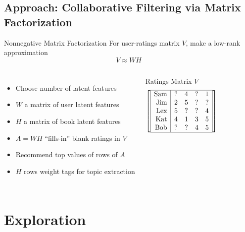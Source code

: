 \documentclass[handout]{beamer}
\begin{document}
\subsection{Approach: Collaborative Filtering via Matrix Factorization}\label{approach}

\begin{frame}
\begin{block}{Nonnegative Matrix Factorization}
\setlength\abovedisplayskip{0pt}
For user-ratings matrix $V$, make a low-rank approximation
\[ V \approx WH\]
\end{block}
\vfill

\begin{columns}
\begin{itemize}[<+->]
\item Choose number of latent features
\item $W$ a matrix of user latent features
\item $H$ a matrix of book latent features
\item %
$A =WH$ ``fills-in'' blank ratings in $V$
\item Recommend top values of rows of $A$
\item $H$ rows weight tags for topic extraction
\end{itemize}
\begin{block}{Ratings Matrix $V$}
\centering
\[\left[\begin{array}{|r|cccc|}\hline
\text{Sam} & ? & 4 & ? & 1 \\
\text{Jim} & 2 & 5 & ? & ? \\
\text{Lex} & 5 & ? & ? & 4 \\
\text{Kat} & 4 & 1 & 3 & 5 \\
\text{Bob} & ? & ? & 4 & 5 \\\hline
\end{array}\right]\]
\end{block}
\end{columns}
\end{frame}





\section%
{Exploration}\label{exploration}
\end{document}
